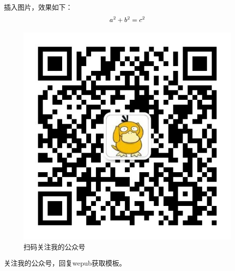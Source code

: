 \documentclass{wepub}
\begin{document}
插入图片，效果如下：
\begin{equation}
a^2+b^2=c^2 \notag
\end{equation}

\begin{figure}[htbp]
	\includegraphics[width=\linewidth]{logo.jpg}\caption{扫码关注我的公众号}
\end{figure}
关注我的公众号，回复wepub获取模板。
\end{document}
